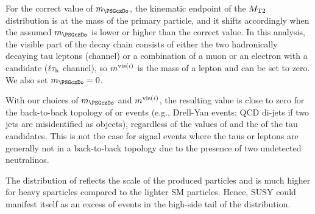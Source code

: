 For the correct value of $m_{\PSGczDo}$, the kinematic endpoint of the ${M_{\rm T2}}$ distribution is at the mass of the primary particle, and it shifts accordingly when the assumed $m_{\PSGczDo}$ is lower or higher than the correct value. In this analysis, 
the visible part of the decay chain consists of either the two hadronically decaying tau leptons (\tauTau channel)
or a combination of a muon or an electron with a \Tau candidate ($\ell\tau_{\rm h}$ channel), so $m^{{\rm vis}(i)}$ is the mass of a lepton and can be set to zero. We also set $m_{\PSGczDo}=0$. 

With  our choices of $m_{\PSGczDo}$ and $m^{{\rm vis}(i)}$, the resulting \mttwo value is close to zero for the 
back-to-back topology of \tauTau or \leptonTau  
events (e.g., Drell-Yan events; QCD di-jets if two jets are misidentified as \Tau objects), regardless of the values of \MPT and the \PT of 
the tau candidates. This is not the case for signal events where the taus or leptons are generally not in a back-to-back topology due 
to the presence of two undetected neutralinos.

The distribution of \mttwo reflects the scale of the produced particles and is much higher for heavy sparticles
compared to the lighter SM particles. Hence, SUSY 
could manifest itself
as an excess of events in the high-side tail of the \mttwo distribution.
